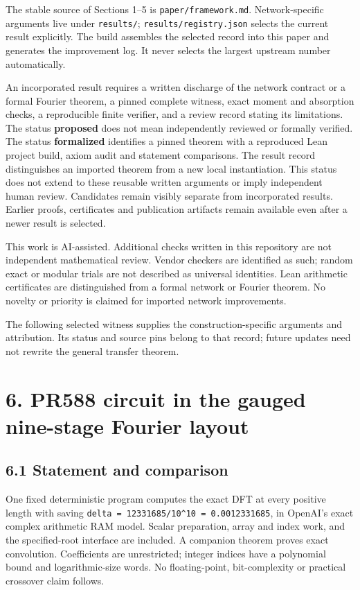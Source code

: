 \documentclass[
  11pt,
]{article}
\begin{document}
The stable source of Sections 1--5 is \texttt{paper/\allowbreak{}framework.md}.
Network-specific arguments live under \texttt{results/\allowbreak{}};
\texttt{results/\allowbreak{}registry.json} selects the current result explicitly.
The build assembles the selected record into this paper and generates
the improvement log. It never selects the largest upstream number
automatically.

An incorporated result requires a written discharge of the network
contract or a formal Fourier theorem, a pinned complete witness, exact
moment and absorption checks, a reproducible finite verifier, and a
review record stating its limitations. The status \textbf{proposed} does
not mean independently reviewed or formally verified. The status
\textbf{formalized} identifies a pinned theorem with a reproduced Lean
project build, axiom audit and statement comparisons. The result record
distinguishes an imported theorem from a new local instantiation. This
status does not extend to these reusable written arguments or imply
independent human review. Candidates remain visibly separate from
incorporated results. Earlier proofs, certificates and publication
artifacts remain available even after a newer result is selected.

This work is AI-assisted. Additional checks written in this repository
are not independent mathematical review. Vendor checkers are identified
as such; random exact or modular trials are not described as universal
identities. Lean arithmetic certificates are distinguished from a formal
network or Fourier theorem. No novelty or priority is claimed for
imported network improvements.

The following selected witness supplies the construction-specific
arguments and attribution. Its status and source pins belong to that
record; future updates need not rewrite the general transfer theorem.

\section{6. PR588 circuit in the gauged nine-stage Fourier
layout}\label{pr588-circuit-in-the-gauged-nine-stage-fourier-layout}

\subsection{6.1 Statement and
comparison}\label{statement-and-comparison}

One fixed deterministic program computes the exact DFT at every positive
length with saving
\texttt{delta\ =\ 12331685/10\^{}10\ =\ 0.0012331685}, in OpenAI's exact
complex arithmetic RAM model. Scalar preparation, array and index work,
and the specified-root interface are included. A companion theorem
proves exact convolution. Coefficients are unrestricted; integer indices
have a polynomial bound and logarithmic-size words. No floating-point,
bit-complexity or practical crossover claim follows.
\end{document}
